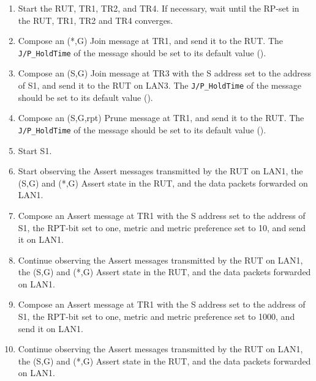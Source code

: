 \documentclass[11pt]{report}
\begin{document}
\begin{enumerate}

  \item Start the RUT, TR1, TR2, and TR4. If necessary, wait until the RP-set
  in the RUT, TR1, TR2 and TR4 converges.

  \item Compose an (*,G) Join message at TR1, and send it to the RUT.
  The \verb=J/P_HoldTime= of the message should be set to its default
  value ({\PimsmJPHoldTime}).

  \item Compose an (S,G) Join message at TR3 with the S address set to the
  address of S1, and send it to the RUT on LAN3.
  The \verb=J/P_HoldTime= of the message should be set to its default
  value ({\PimsmJPHoldTime}).

  \item Compose an (S,G,rpt) Prune message at TR1, and send it to the RUT.
  The \verb=J/P_HoldTime= of the message should be set to its default
  value ({\PimsmJPHoldTime}).

  \item Start S1.

  \item Start observing the Assert messages transmitted by the RUT on
  LAN1, the (S,G) and (*,G) Assert state in the RUT, and the data packets
  forwarded on LAN1. 

  \item Compose an Assert message at TR1 with the S address set to the
  address of S1, the RPT-bit set to one, metric and metric preference set to
  10, and send it on LAN1.

  \item Continue observing the Assert messages transmitted by the RUT on
  LAN1, the (S,G) and (*,G) Assert state in the RUT, and the data packets
  forwarded on LAN1.

  \item Compose an Assert message at TR1 with the S address set to the
  address of S1, the RPT-bit set to one, metric and metric preference set to
  1000, and send it on LAN1.

  \item Continue observing the Assert messages transmitted by the RUT on
  LAN1, the (S,G) and (*,G) Assert state in the RUT, and the data packets
  forwarded on LAN1.

\end{enumerate}


\end{document}
